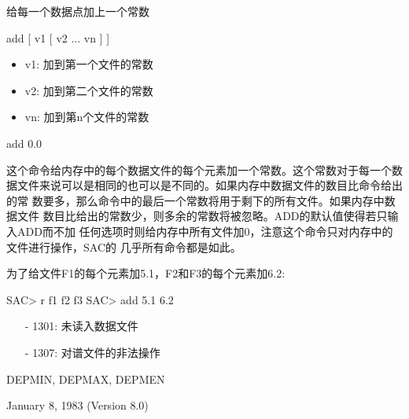 \label{cmd:add}

给每一个数据点加上一个常数

\begin{SACSTX}
add [ v1 [ v2 ... vn ] ]
\end{SACSTX}

\begin{itemize}
\item v1:  加到第一个文件的常数
\item v2:  加到第二个文件的常数
\item vn:  加到第n个文件的常数
\end{itemize}

add 0.0

这个命令给内存中的每个数据文件的每个元素加一个常数。这个常数对于每一个数
据文件来说可以是相同的也可以是不同的。如果内存中数据文件的数目比命令给出的常
数要多，那么命令中的最后一个常数将用于剩下的所有文件。如果内存中数据文件
数目比给出的常数少，则多余的常数将被忽略。ADD的默认值使得若只输入ADD而不加
任何选项时则给内存中所有文件加0，注意这个命令只对内存中的文件进行操作，SAC的
几乎所有命令都是如此。


为了给文件F1的每个元素加5.1，F2和F3的每个元素加6.2:
\begin{SACCode}
SAC> r f1 f2 f3
SAC> add 5.1 6.2
\end{SACCode}

\begin{itemize}
\item[-]1301: 未读入数据文件
\item[-]1307: 对谱文件的非法操作
\end{itemize}

DEPMIN, DEPMAX, DEPMEN

January 8, 1983 (Version 8.0)
